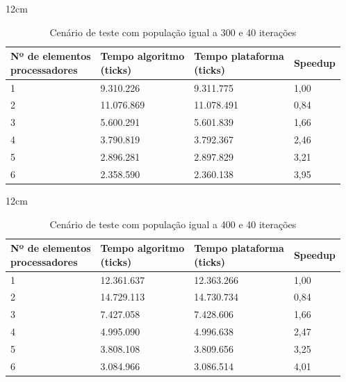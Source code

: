 \begin{table}[h]{12cm}
    \caption{Cenário de teste com população igual a 300 e 40 iterações}
    \label{cenario13}
    \begin{tabular}{llll}
        \hline
        \shortstack[l]{Nº de elementos \\ processadores} & \shortstack[l]{Tempo algoritmo \\ (ticks)} & \shortstack[l]{Tempo plataforma \\ (ticks)} & Speedup \\
        \hline
        1 & 9.310.226  & 9.311.775  & 1,00 \\
        2 & 11.076.869 & 11.078.491 & 0,84 \\
        3 & 5.600.291  & 5.601.839  & 1,66 \\
        4 & 3.790.819  & 3.792.367  & 2,46 \\
        5 & 2.896.281  & 2.897.829  & 3,21 \\
        6 & 2.358.590  & 2.360.138  & 3,95 \\
        \hline
    \end{tabular}
\end{table}

\begin{table}[h]{12cm}
    \caption{Cenário de teste com população igual a 400 e 40 iterações}
    \label{cenario14}
    \begin{tabular}{llll}
        \hline
        \shortstack[l]{Nº de elementos \\ processadores} & \shortstack[l]{Tempo algoritmo \\ (ticks)} & \shortstack[l]{Tempo plataforma \\ (ticks)} & Speedup \\
        \hline
        1 & 12.361.637 & 12.363.266 & 1,00 \\
        2 & 14.729.113 & 14.730.734 & 0,84 \\
        3 & 7.427.058  & 7.428.606  & 1,66 \\
        4 & 4.995.090  & 4.996.638  & 2,47 \\
        5 & 3.808.108  & 3.809.656  & 3,25 \\
        6 & 3.084.966  & 3.086.514  & 4,01 \\
        \hline
    \end{tabular}
\end{table}

